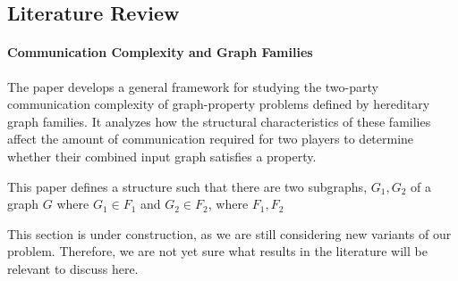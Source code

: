 \subsection{Literature Review}

\paragraph{Communication Complexity and Graph Families} The paper develops a general framework for studying the two-party communication complexity of graph-property problems defined by hereditary graph families. It analyzes how the structural characteristics of these families affect the amount of communication required for two players to determine whether their combined input graph satisfies a property. 

This paper defines a structure such that there are two subgraphs, $G_1, G_2$ of a graph $G$ where $G_1 \in F_1$ and $G_2 \in F_2$, where $F_1, F_2$

This section is under construction, as we are still considering new variants of our problem.
Therefore, we are not yet sure what results in the literature will be relevant to discuss here.